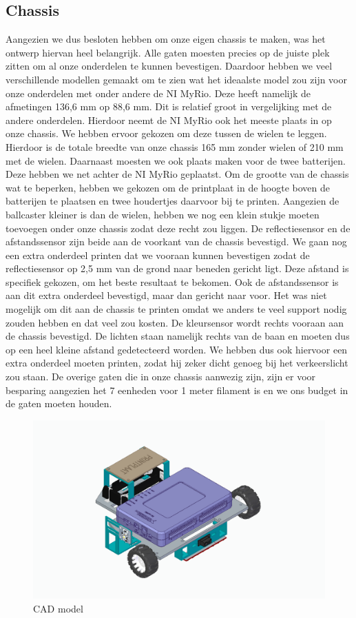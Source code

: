 \documentclass[kulak]{kulakarticle} %
\begin{document}
\subsection{Chassis}
Aangezien we dus besloten hebben om onze eigen chassis te maken, was het ontwerp hiervan heel belangrijk. Alle gaten moesten precies op de juiste plek zitten om al onze onderdelen te kunnen bevestigen. Daardoor hebben we veel verschillende modellen gemaakt om te zien wat het ideaalste model zou zijn voor onze onderdelen met onder andere de NI MyRio. Deze heeft namelijk de afmetingen 136,6 mm op 88,6 mm. Dit is relatief groot in vergelijking met de andere onderdelen. Hierdoor neemt de NI MyRio ook het meeste plaats in op onze chassis. We hebben ervoor gekozen om deze tussen de wielen te leggen. Hierdoor is de totale breedte van onze chassis 165 mm zonder wielen of 210 mm met de wielen. Daarnaast moesten we ook plaats maken voor de twee batterijen. Deze hebben we net achter de NI MyRio geplaatst. Om de grootte van de chassis wat te beperken, hebben we gekozen om de printplaat in de hoogte boven de batterijen te plaatsen en twee houdertjes daarvoor bij te printen. Aangezien de ballcaster kleiner is dan de wielen, hebben we nog een klein stukje moeten toevoegen onder onze chassis zodat deze recht zou liggen. De reflectiesensor en de afstandssensor zijn beide aan de voorkant van de chassis bevestigd. We gaan nog een extra onderdeel printen dat we vooraan kunnen bevestigen zodat de reflectiesensor op 2,5 mm van de grond naar beneden gericht ligt. Deze afstand is specifiek gekozen, om het beste resultaat te bekomen. Ook de afstandssensor is aan dit extra onderdeel bevestigd, maar dan gericht naar voor. Het was niet mogelijk om dit aan de chassis te printen omdat we anders te veel support nodig zouden hebben en dat veel zou kosten. De kleursensor wordt rechts vooraan aan de chassis bevestigd. De lichten staan namelijk rechts van de baan en moeten dus op een heel kleine afstand gedetecteerd worden. We hebben dus ook hiervoor een extra onderdeel moeten printen, zodat hij zeker dicht genoeg bij het verkeerslicht zou staan. De overige gaten die in onze chassis aanwezig zijn, zijn er voor besparing aangezien het 7 eenheden voor 1 meter filament is en we ons budget in de gaten moeten houden. 
\begin{figure}[h]
	\centering
	\includegraphics[width=.7\textwidth]{FotoChassisVerslag (2)}
	\caption{CAD model}
	\label{fig:chassis2}
\end{figure}
\end{document}
